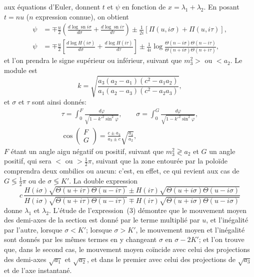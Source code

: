 \documentclass[11pt,leqno,oneside,letterpaper]{book}[2005/09/16]
\DeclareMathOperator{\sn}{sn}
\begin{document}
aux \'equations d'Euler, donnent $t$ et $\psi$ en fonction de $x = \lambda_1 + \lambda_2$.
En posant $t = nu$ ($n$ expression connue), on obtient
\begin{align*}
\tag{2}
  \psi
&= \mp \frac{u}{2} \left( \frac{d\log\sn i\sigma}{d\sigma}
                        + \frac{d\log\sn i\tau  }{d\tau  } \right)
   \pm \frac{1}{2i} \left[\Pi(u, i\sigma) + \Pi(u, i\tau) \right],
\\
\tag{3}
  \psi
&= \mp \frac{u}{2} \left[ \frac{d\log H(i\sigma)}{d\sigma}
                        + \frac{d\log H(i\tau  )}{d\tau  } \right]
   \pm \frac{1}{4i} \log
          \frac{\Theta(n-i\sigma) \Theta(n-i\tau)}{\Theta(n+i\sigma) \Theta(n+i\tau)},
\end{align*}
et l'on prendra le signe sup\'erieur ou inf\'erieur, suivant que
$m_3^2 >$ ou $< a_2$.
Le module est
\[
k = \sqrt{ \frac{a_3(a_2-a_1)(c^2-a_1a_2)}{a_1(a_2-a_3)(c^2-a_2a_3)} },
\]
et $\sigma$ et $\tau$ sont ainsi donn\'es:
\begin{gather*}
  \tau   = \int_0^F \frac{d\varphi}{\sqrt{1-k'^2\sin^2\varphi}}, \qquad
  \sigma = \int_0^G \frac{d\varphi}{\sqrt{1-k'^2\sin^2\varphi}},
\\[0.7ex]
  \cos\begin{pmatrix}F\\G\end{pmatrix} = \frac{c\pm a_3}{a_3\pm c}
  \sqrt{\frac{a_3}{a_2}},
\end{gather*}
$F$ \'etant un angle aigu n\'egatif ou positif, suivant que
$m_3^2 \gtrless a_2$ et $G$ un angle
positif, qui sera $<$ ou $> \frac{1}{2}\pi$, suivant que la zone entour\'ee par la polo\"ide
comprendra deux ombilics ou aucun: c'est, en effet, ce qui revient
aux cas de $G \lessgtr \frac{1}{2}\pi$ ou de $\sigma \lessgtr K'$. La double expression
\[
c\,\frac{    H(i\sigma) \sqrt{ \Theta(u+i\tau  ) \Theta(u-i\tau  ) }
       \pm H(i\tau  ) \sqrt{ \Theta(u+i\sigma) \Theta(u-i\sigma) }}{
           H(i\sigma) \sqrt{ \Theta(u+i\tau  ) \Theta(u-i\tau  ) }
       \mp H(i\tau  ) \sqrt{ \Theta(u+i\sigma) \Theta(u-i\sigma) }}
\]
donne $\lambda_1$ et $\lambda_2$. L'\'etude de l'expression~(3) d\'emontre que le mouvement
moyen des demi-axes de la section est donn\'e par le terme multipli\'e par $u$,
et l'in\'egalit\'e par l'autre, lorsque $\sigma < K'$; lorsque $\sigma > K'$, le mouvement
moyen et l'in\'egalit\'e sont donn\'es par les m\^emes termes en y changeant $\sigma$
en $\sigma - 2K'$; et l'on trouve que, dans le second cas, le mouvement moyen
co\"incide avec celui des projections des demi-axes $\sqrt{a_1}$ et $\sqrt{a_2}$, et dans le
premier avec celui des projections de $\sqrt{a_3}$ et de l'axe instantan\'e.
\end{document}
